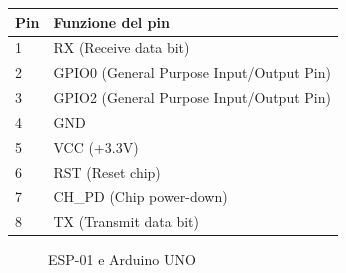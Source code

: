 \documentclass[12pt]{report}
\begin{document}
\vspace{\baselineskip}
\begin{minipage}{\textwidth}
	\begin{minipage}[b]{0.35\textwidth}
		\label{fig:esp_pinout_img}
	\end{minipage}
	\hfill
	\begin{minipage}[b]{0.65\textwidth}
		\centering
		\begin{tabular}{l|l}
			\textbf{Pin} & \textbf{Funzione del pin} \\
			\hline
			1 & RX (Receive data bit) \\
			2 & GPIO0 (General Purpose Input/Output Pin) \\
			3 & GPIO2 (General Purpose Input/Output Pin) \\
			4 & GND \\
			5 & VCC (+3.3V) \\
			6 & RST (Reset chip) \\
			7 & CH\_PD (Chip power-down) \\
			8 & TX (Transmit data bit) \\
		\end{tabular}
		\label{tab:esp01_pinout}
	\end{minipage}
\end{minipage}
\vspace{\baselineskip}

\begin{figure}
	\caption{ESP-01 e Arduino UNO}
	\label{fig:esp_uno}
\end{figure}
\end{document}
